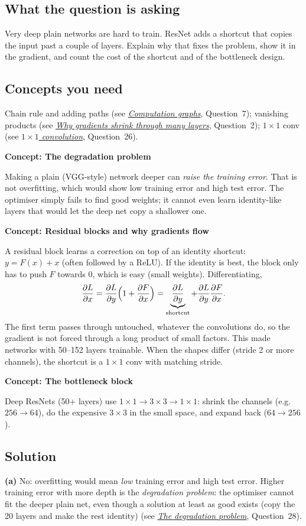 \documentclass[12pt,a4paper]{article}
\newcommand{\concept}[2]{\par\medskip\phantomsection\label{#1}{\large\bfseries\color{blue!50!black} Concept: #2}\par}
\newcommand{\seeconcept}[3]{(see \hyperref[#1]{\textit{#2}}, Question~#3)}
\begin{document}
\subsection*{What the question is asking}
Very deep plain networks are hard to train. ResNet adds a shortcut that copies the input past a couple of layers. Explain why that fixes the problem, show it in the gradient, and count the cost of the shortcut and of the bottleneck design.

\subsection*{Concepts you need}
Chain rule and adding paths \seeconcept{c:graph}{Computation graphs}{7}; vanishing products \seeconcept{c:vanish}{Why gradients shrink through many layers}{2}; $1\times1$ conv \seeconcept{c:pointwise}{$1\times1$ convolution}{26}.

\concept{c:degradation}{The degradation problem}
Making a plain (VGG-style) network deeper can \emph{raise the training error}. That is not overfitting, which would show low training error and high test error. The optimiser simply fails to find good weights; it cannot even learn identity-like layers that would let the deep net copy a shallower one.

\concept{c:residual}{Residual blocks and why gradients flow}
A residual block learns a correction on top of an identity shortcut: $y=F(x)+x$ (often followed by a ReLU). If the identity is best, the block only has to push $F$ towards 0, which is easy (small weights). Differentiating,
\[
\frac{\partial L}{\partial x}=\frac{\partial L}{\partial y}\Bigl(1+\frac{\partial F}{\partial x}\Bigr)=\underbrace{\frac{\partial L}{\partial y}}_{\text{shortcut}}+\frac{\partial L}{\partial y}\frac{\partial F}{\partial x}.
\]
The first term passes through untouched, whatever the convolutions do, so the gradient is not forced through a long product of small factors. This made networks with 50--152 layers trainable. When the shapes differ (stride 2 or more channels), the shortcut is a $1\times1$ conv with matching stride.

\concept{c:bottleneck}{The bottleneck block}
Deep ResNets (50+ layers) use $1\times1\to3\times3\to1\times1$: shrink the channels (e.g.\ $256\to64$), do the expensive $3\times3$ in the small space, and expand back ($64\to256$).

\subsection*{Solution}
\textbf{(a)} No: overfitting would mean \emph{low} training error and high test error. Higher training error with more depth is the \emph{degradation problem}: the optimiser cannot fit the deeper plain net, even though a solution at least as good exists (copy the 20 layers and make the rest identity) \seeconcept{c:degradation}{The degradation problem}{28}.
\end{document}
